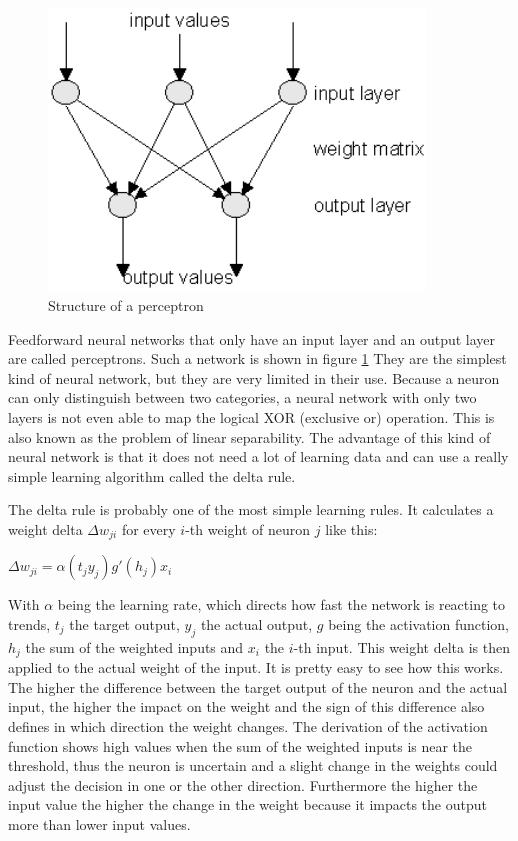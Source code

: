 \begin{figure}[ht]
	\centering
  \includegraphics[width=10cm]{figures/perceptron}
	\caption[Structure of a perceptron]{Structure of a perceptron \protect\footnotemark}
	\label{perceptron}
\end{figure}

Feedforward neural networks that only have an input layer and an output layer are called perceptrons. Such a network is shown in figure \ref{perceptron} They are the simplest kind of neural network, but they are very limited in their use. Because a neuron can only distinguish between two categories, a neural network with only two layers is not even able to map the logical XOR (exclusive or) operation. This is also known as the problem of linear separability. The advantage of this kind of neural network is that it does not need a lot of learning data and can use a really simple learning algorithm called the delta rule.

The delta rule is probably one of the most simple learning rules. It calculates a weight delta $\Delta w_{ji}$ for every $i$-th weight of neuron $j$ like this:

\begin{center}
	$\Delta w_{ji} = \alpha (t_j  y_j)g'(h_j)x_i$
\end{center}

With $\alpha$ being the learning rate, which directs how fast the network is reacting to trends, $t_j$ the target output, $y_j$ the actual output, $g$ being the activation function, $h_j$ the sum of the weighted inputs and $x_i$ the $i$-th input. This weight delta is then applied to the actual weight of the input. It is pretty easy to see how this works. The higher the difference between the target output of the neuron and the actual input, the higher the impact on the weight and the sign of this difference also defines in which direction the weight changes. The derivation of the activation function shows high values when the sum of the weighted inputs is near the threshold, thus the neuron is uncertain and a slight change in the weights could adjust the decision in one or the other direction. Furthermore the higher the input value the higher the change in the weight because it impacts the output more than lower input values.

